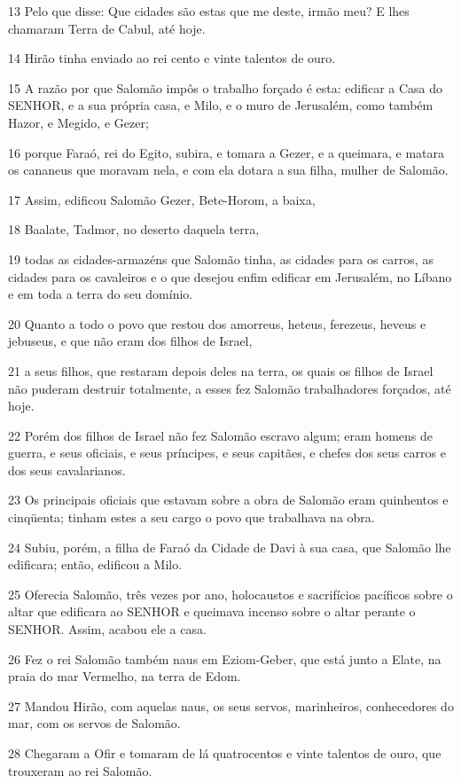 \par 13 Pelo que disse: Que cidades são estas que me deste, irmão meu? E lhes chamaram Terra de Cabul, até hoje.
\par 14 Hirão tinha enviado ao rei cento e vinte talentos de ouro.
\par 15 A razão por que Salomão impôs o trabalho forçado é esta: edificar a Casa do SENHOR, e a sua própria casa, e Milo, e o muro de Jerusalém, como também Hazor, e Megido, e Gezer;
\par 16 porque Faraó, rei do Egito, subira, e tomara a Gezer, e a queimara, e matara os cananeus que moravam nela, e com ela dotara a sua filha, mulher de Salomão.
\par 17 Assim, edificou Salomão Gezer, Bete-Horom, a baixa,
\par 18 Baalate, Tadmor, no deserto daquela terra,
\par 19 todas as cidades-armazéns que Salomão tinha, as cidades para os carros, as cidades para os cavaleiros e o que desejou enfim edificar em Jerusalém, no Líbano e em toda a terra do seu domínio.
\par 20 Quanto a todo o povo que restou dos amorreus, heteus, ferezeus, heveus e jebuseus, e que não eram dos filhos de Israel,
\par 21 a seus filhos, que restaram depois deles na terra, os quais os filhos de Israel não puderam destruir totalmente, a esses fez Salomão trabalhadores forçados, até hoje.
\par 22 Porém dos filhos de Israel não fez Salomão escravo algum; eram homens de guerra, e seus oficiais, e seus príncipes, e seus capitães, e chefes dos seus carros e dos seus cavalarianos.
\par 23 Os principais oficiais que estavam sobre a obra de Salomão eram quinhentos e cinqüenta; tinham estes a seu cargo o povo que trabalhava na obra.
\par 24 Subiu, porém, a filha de Faraó da Cidade de Davi à sua casa, que Salomão lhe edificara; então, edificou a Milo.
\par 25 Oferecia Salomão, três vezes por ano, holocaustos e sacrifícios pacíficos sobre o altar que edificara ao SENHOR e queimava incenso sobre o altar perante o SENHOR. Assim, acabou ele a casa.
\par 26 Fez o rei Salomão também naus em Eziom-Geber, que está junto a Elate, na praia do mar Vermelho, na terra de Edom.
\par 27 Mandou Hirão, com aquelas naus, os seus servos, marinheiros, conhecedores do mar, com os servos de Salomão.
\par 28 Chegaram a Ofir e tomaram de lá quatrocentos e vinte talentos de ouro, que trouxeram ao rei Salomão.

